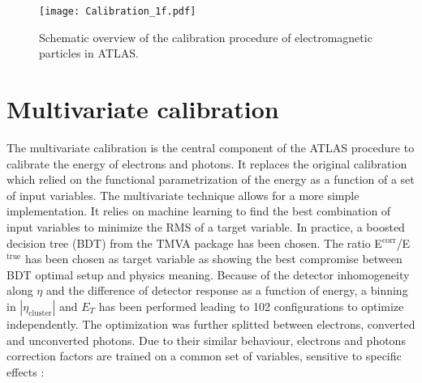 \begin{figure}[htbp]
\centering
\texttt{[image: Calibration\_1f.pdf]}
\caption{\label{fig:orgfcfa421}
Schematic overview of the calibration procedure of electromagnetic particles in ATLAS.\cite{CERN-PH-EP-2014-153}}
\end{figure}


\section{Multivariate calibration}
\label{sec:org8232c38}

The multivariate calibration \cite{CERN-PH-EP-2014-153,ATL-COM-PHYS-2013-1426,ATL-COM-PHYS-2017-761} is the central component of the ATLAS procedure to calibrate the energy of electrons and photons.
It replaces the original calibration \cite{ATL-LARG-PUB-2007-012} which relied on the functional parametrization of the energy as a function of a set of input variables.
The multivariate technique allows for a more simple implementation.
It relies on machine learning to find the best combination of input variables to minimize the RMS of a target variable.
In practice, a boosted decision tree (BDT) from the TMVA package \cite{physics/0703039,CERN-OPEN-2007-007} has been chosen.
The ratio E\(^{\text{corr}}\)/E\(^{\text{true}}\) has been chosen as target variable as showing the best compromise between BDT optimal setup and physics meaning.
Because of the detector inhomogeneity along $\eta$ and the difference of detector response as a function of energy, a binning in $|\eta_\text{cluster}|$ and $E_T$ has been performed leading to 102 configurations to optimize independently.
The optimization was further splitted between electrons, converted and unconverted photons.
Due to their similar behaviour, electrons and photons correction factors are trained on a common set of variables, sensitive to specific effects :

